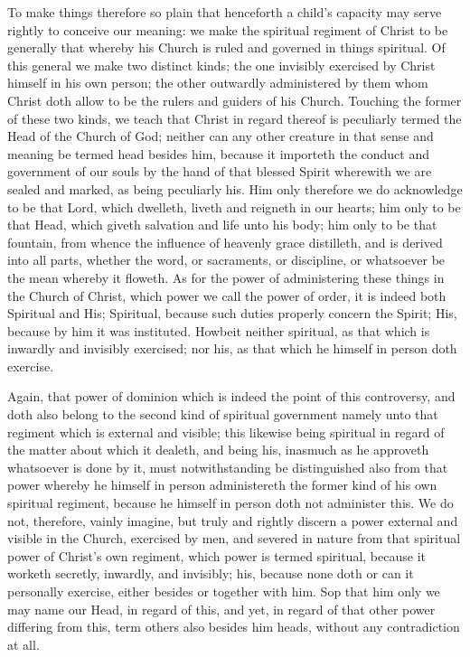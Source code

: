 To make things therefore so plain that henceforth a child’s capacity may serve rightly to conceive our meaning: we make the spiritual regiment of Christ to be generally that whereby his Church is ruled and governed in things spiritual. Of this general we make two distinct kinds; the one invisibly exercised by Christ himself in his own person; the other outwardly administered by them whom Christ doth allow to be the rulers and guiders of his Church. Touching the former of these two kinds, we teach that Christ in regard thereof is peculiarly termed the Head of the Church of God; neither can any other creature in that sense and meaning be termed head besides him, because it importeth the conduct and government of our souls by the hand of that blessed Spirit wherewith we are sealed and marked, as being peculiarly his. Him only therefore we do acknowledge to be that Lord, which dwelleth, liveth and reigneth in our hearts; him only to be that Head, which giveth salvation and life unto his body; him only to be that fountain, from whence the influence of heavenly grace distilleth, and is derived into all parts, whether the word, or sacraments, or discipline, or whatsoever be the mean whereby it floweth. As for the power of administering these things in the Church of Christ, which power we call the power of order, it is indeed both Spiritual and His; Spiritual, because such duties properly concern the Spirit; His, because by him it was instituted. Howbeit neither spiritual, as that which is inwardly and invisibly exercised; nor his, as that which he himself in person doth exercise.

Again, that power of dominion which is indeed the point of this controversy, and doth also belong to the second kind of spiritual government namely unto that regiment which is  external and visible; this likewise being spiritual in regard of the matter about which it dealeth, and being his, inasmuch as he approveth whatsoever is done by it, must notwithstanding be distinguished also from that power whereby he himself in person administereth the former kind of his own spiritual regiment, because he himself in person doth not administer this. We do not, therefore, vainly imagine, but truly and rightly discern a power external and visible in the Church, exercised by men, and severed in nature from that spiritual power of Christ’s own regiment, which power is termed spiritual, because it worketh secretly, inwardly, and invisibly; his, because none doth or can it personally exercise, either besides or together with him. Sop that him only we may name our Head, in regard of this, and yet, in regard of that other power differing from this, term others also besides him heads, without any contradiction at all.

